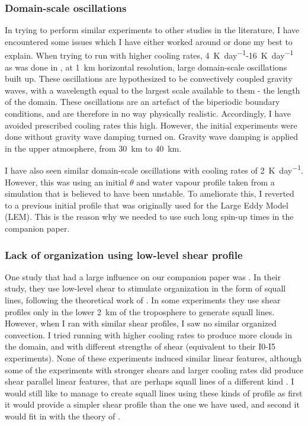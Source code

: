 \documentclass[11pt,a4paper]{article}
\begin{document}
\subsubsection{Domain-scale oscillations}
In trying to perform similar experiments to other studies in the literature, I have encountered some issues which I have either worked around or done my best to explain. When trying to run with higher cooling rates, \SI{4}{K.day^{-1}}-\SI{16}{K.day^{-1}} as was done in \cite{cohen2006fluctuations}, at \SI{1}{km} horizontal resolution, large domain-scale oscillations built up. These oscillations are hypothesized to be convectively coupled gravity waves, with a wavelength equal to the largest scale available to them - the length of the domain. These oscillations are an artefact of the biperiodic boundary conditions, and are therefore in no way physically realistic. Accordingly, I have avoided prescribed cooling rates this high. However, the initial experiments were done without gravity wave damping turned on. Gravity wave damping is applied in the upper atmosphere, from \SI{30}{km} to \SI{40}{km}.

I have also seen similar domain-scale oscillations with cooling rates of \SI{2}{K.day^{-1}}. However, this was using an initial $\theta$ and water vapour profile taken from a simulation that is believed to have been unstable. To ameliorate this, I reverted to a previous initial profile that was originally used for the Large Eddy Model (LEM). This is the reason why we needed to use such long spin-up times in the companion paper.

\subsubsection{Lack of organization using low-level shear profile}
One study that had a large influence on our companion paper was \cite{RE2001}. In their study, they use low-level shear to stimulate organization in the form of squall lines, following the theoretical work of \cite{RKW1988}. In some experiments they use shear profiles only in the lower \SI{2}{km} of the troposphere to generate squall lines. However, when I ran with similar shear profiles, I saw no similar organized convection. I tried running with higher cooling rates to produce more clouds in the domain, and with different strengths of shear (equivalent to their I0-I5 experiments). None of these experiments induced similar linear features, although some of the experiments with stronger shears and larger cooling rates did produce shear parallel linear features, that are perhaps squall lines of a different kind \parencite{parker2007simulated}. I would still like to manage to create squall lines using these kinds of profile as first it would provide a simpler shear profile than the one we have used, and second it would fit in with the theory of \cite{RKW1988}.
\end{document}
